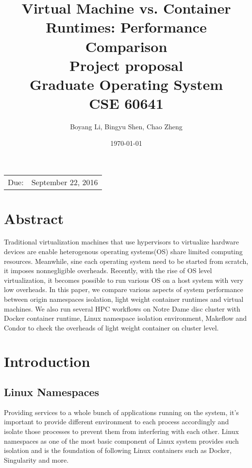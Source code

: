 \documentclass{article}
\title{{\textbf{Virtual Machine vs. Container Runtimes: Performance Comparison}} \\
       \vspace{3\baselineskip}
       {\large Project proposal} \\
       \vspace{3\baselineskip}
       {\large Graduate Operating System} \\ 
       {\large CSE 60641} %
      }
\date{\today} %
\author{Boyang Li, Bingyu Shen, Chao Zheng}
\begin{document}
\maketitle %

\begin{center}
\begin{tabular}{l r}
Due:& September 22, 2016\\ 
\end{tabular}
\end{center}
\nocite{*}

\pagebreak

\section{Abstract}

Traditional virtualization machines that use hypervisors to virtualize hardware devices are 
enable heterogenous operating systems(OS) share limited computing resources. Meanwhile, sine each 
operating system need to be started from scratch, it imposes nonnegligible overheads. Recently, 
with the rise of OS level virtualization, it becomes possible to run various OS on a host system 
with very low overheads. In this paper, we compare various aspects of system performance between 
origin namespaces isolation, light weight container runtimes and virtual machines. We also run several
HPC workflows on Notre Dame disc cluster with Docker container runtime\cite{dockerwb}, Linux namespace
isolation environment, Makeflow\cite{albrecht2012makeflow} and Condor\cite{thain2003condor} to check the 
overheads of light weight container on cluster level.  

\section{Introduction}

\subsection{Linux Namespaces}

Providing services to a whole bunch of applications running on the system, it's important to provide different environment to each process accordingly and isolate those processes to prevent them from interfering with each other. Linux namespaces as one of the most basic component of Linux system provides such isolation and is the foundation of following Linux containers such as Docker, Singularity and more.
\end{document}
